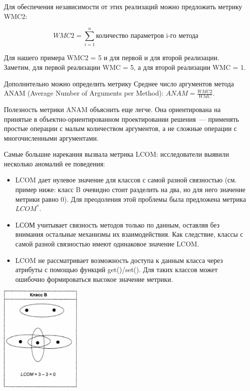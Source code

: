 \documentclass{../../text-style}
\begin{document}
Для обеспечения независимости от этих реализаций можно предложить метрику WMC2:

$$WMC2 = \sum_{i=1}^{n}\text{количество параметров i-го метода}$$

Для нашего примера WMC2 = 5 и для первой и для второй реализации. Заметим, для первой реализации WMC = 5, а для второй реализации WMC = 1.

Дополнительно можно определить метрику Среднее число аргументов метода ANAM (Average Number of Arguments per Method): $ANAM = \frac{WMC2}{WMC}$.

Полезность метрики ANAM объяснить еще легче. Она ориентирована на принятые в объектно-ориентированном проектировании решения~--- применять простые операции с малым количеством аргументов, а не сложные операции с многочисленными аргументами.

Самые большие нарекания вызвала метрика LCOM: исследователи выявили несколько аномалий ее поведения:

\begin{itemize}
    \item LCOM дает нулевое значение для классов с самой разной связностью (см. пример ниже: класс B очевидно стоит разделить на два, но для него значение метрики равно 0). Для преодоления этой проблемы была предложена метрика $LCOM^*$.
    \item LСОМ учитывает связность методов только по данным, оставляя без внимания остальные механизмы их взаимодействия. Как следствие, классы с самой разной связностью имеют одинаковое значение LCOM.
    \item LCOM не рассматривает возможность доступа к данным класса через атрибуты с помощью функций get()/set(). Для таких классов может ошибочно формиро­ваться высокое значение метрики.
\end{itemize}

\begin{center}
    \includegraphics[width=0.3\textwidth]{lcomFail.png}
\end{center}
\end{document}
